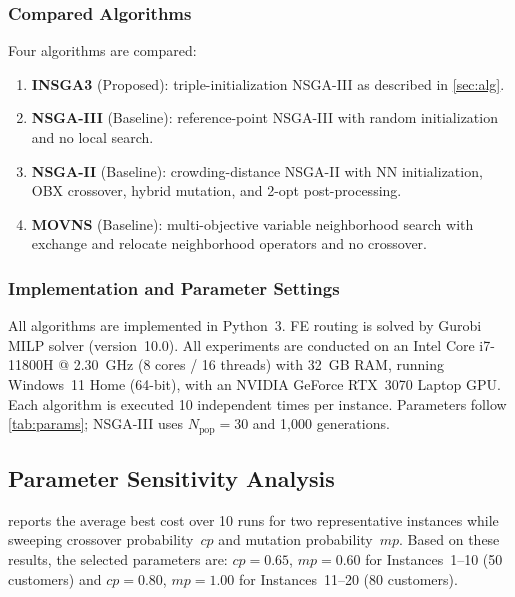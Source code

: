 \documentclass[11pt, a4paper]{article}
\numberwithin{equation}{section}
\begin{document}
\subsubsection{Compared Algorithms}

Four algorithms are compared:
\begin{enumerate}
  \item \textbf{INSGA3} (Proposed): triple-initialization NSGA-III as
        described in \cref{sec:alg}.
  \item \textbf{NSGA-III} (Baseline): reference-point NSGA-III
        \cite{deb2014nsga3} with random initialization and no local search.
  \item \textbf{NSGA-II} (Baseline): crowding-distance NSGA-II
        \cite{deb2002nsga2} with NN initialization, OBX crossover, hybrid
        mutation, and 2-opt post-processing.
  \item \textbf{MOVNS} (Baseline): multi-objective variable neighborhood
        search with exchange and relocate neighborhood operators and no
        crossover.
\end{enumerate}

\subsubsection{Implementation and Parameter Settings}

All algorithms are implemented in Python~3.  FE routing is solved by Gurobi
MILP solver (version~10.0).  All experiments are conducted on an Intel Core i7-11800H @
2.30~GHz (8 cores / 16 threads) with 32~GB RAM, running Windows~11 Home
(64-bit), with an NVIDIA GeForce RTX~3070 Laptop GPU\@.  Each algorithm is executed 10 independent times per instance.
Parameters follow \cref{tab:params}; NSGA-III uses $N_{\mathrm{pop}}=30$ and
1{,}000 generations.

\subsection{Parameter Sensitivity Analysis}

 reports the average best cost over 10 runs for two
representative instances while sweeping crossover probability~$cp$ and
mutation probability~$mp$.  Based on these results, the selected parameters
are: $cp=0.65$, $mp=0.60$ for Instances~1--10 (50 customers) and
$cp=0.80$, $mp=1.00$ for Instances~11--20 (80 customers).
\end{document}
